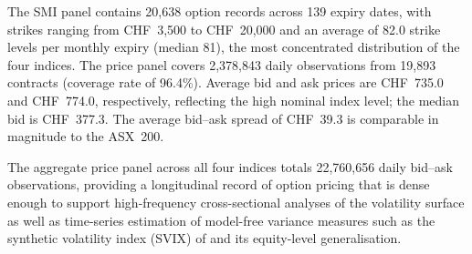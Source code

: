 \documentclass[12pt]{article}
\begin{document}
The SMI panel contains 20{,}638 option records across 139 expiry dates,
with strikes ranging from CHF~3{,}500 to CHF~20{,}000 and an average of
82.0 strike levels per monthly expiry (median 81), the most concentrated
distribution of the four indices. The price panel covers 2{,}378{,}843
daily observations from 19{,}893 contracts (coverage rate of 96.4\%).
Average bid and ask prices are CHF~735.0 and CHF~774.0, respectively,
reflecting the high nominal index level; the median bid is CHF~377.3.
The average bid--ask spread of CHF~39.3 is comparable in magnitude to
the ASX~200.

The aggregate price panel across all four indices totals 22{,}760{,}656
daily bid--ask observations, providing a longitudinal record of option
pricing that is dense enough to support high-frequency cross-sectional
analyses of the volatility surface as well as time-series estimation
of model-free variance measures such as the synthetic volatility index
(SVIX) of \citet{martin2017} and its equity-level generalisation.
\end{document}
